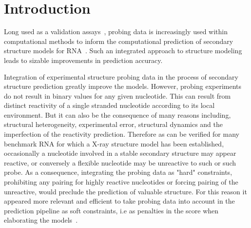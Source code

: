 \documentclass[a4,center,fleqn]{NAR}
\begin{document}


\section{Introduction}


Long used as a validation assays~\cite{Brunel2000}, probing data is increasingly used within computational methods to inform the computational prediction of  secondary structure models for RNA~\cite{Mathews2004}. Such an integrated approach to structure modeling leads to sizable improvements in prediction accuracy.


Integration of experimental structure probing data in the process of secondary structure prediction greatly improve the models. However, probing experiments do not result in binary values for any given nucleotide. This can result from distinct reactivity of a single stranded nucleotide according to its local environment. But it can also be the consequence of many reasons including, structural heterogeneity, experimental error, structural dynamics and the imperfection of the reactivity prediction. Therefore as can be verified for many benchmark RNA for which a X-ray structure model has been established, occasionally a nucleotide involved in a stable secondary structure may appear reactive, or conversely a flexible nucleotide may be unreactive to such or such probe. As a consequence, integrating the probing data as "hard" constraints, prohibiting any pairing for highly reactive nucleotides or forcing pairing of the unreactive, would preclude the prediction of valuable structure. For this reason it appeared more relevant and efficient to take probing data into account in the prediction pipeline as soft constraints, i.e as penalties in the score when elaborating the models~\cite{Deigan2009,Washietl2012,Zarringhalam2012}. 
\enlargethispage{-65.1pt}
\end{document}
